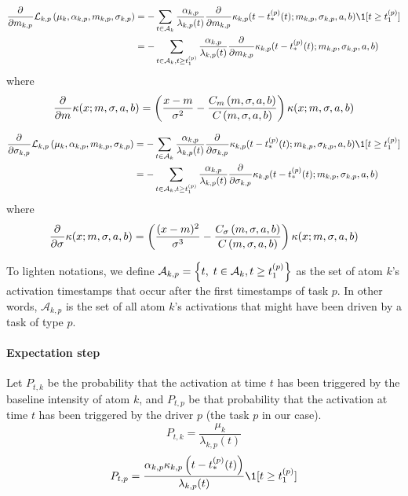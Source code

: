 \begin{equation}
\begin{split}
    \partiald{}{m_{k,p}}\mathcal{L}_{k,p}\pars{\mu_k, \alpha_{k,p}, m_{k,p}, \sigma_{k,p}} &= -\sum_{t\in\mathcal{A}_k}\frac{\alpha_{k,p}}{\lambda_{k,p}(t)}\partiald{}{m_{k,p}}\kappa_{k,p}(t - t_*^{(p)}(t); m_{k,p}, \sigma_{k,p}, a, b)\1[t \geq t_1^{(p)}] \\
    &= -\sum_{t\in\mathcal{A}_k, t \geq t_1^{(p)}}\frac{\alpha_{k,p}}{\lambda_{k,p}(t)}\partiald{}{m_{k,p}}\kappa_{k,p}(t - t_*^{(p)}(t); m_{k,p}, \sigma_{k,p}, a, b)
\end{split}
\end{equation}
where
\begin{equation}
    \frac{\partial^{}}{\partial {m}^{}}\kappa(x ; m, \sigma, a, b) = \left( \frac{x-m}{\sigma^2} - \frac{C_m\left( m, \sigma,a,b \right)}{C\left( m, \sigma,a,b \right)} \right)\kappa(x ; m, \sigma, a, b)
\end{equation}

\begin{equation}
\begin{split}
    \partiald{}{\sigma_{k,p}}\mathcal{L}_{k,p}\pars{\mu_k, \alpha_{k,p}, m_{k,p}, \sigma_{k,p}} &= -\sum_{t\in\mathcal{A}_k}\frac{\alpha_{k,p}}{\lambda_{k,p}(t)}\partiald{}{\sigma_{k,p}}\kappa_{k,p}(t - t_*^{(p)}(t); m_{k,p}, \sigma_{k,p}, a, b)\1[t \geq t_1^{(p)}] \\
    &= -\sum_{t\in\mathcal{A}_k, t \geq t_1^{(p)}}\frac{\alpha_{k,p}}{\lambda_{k,p}(t)}\partiald{}{\sigma_{k,p}}\kappa_{k,p}(t - t_*^{(p)}(t); m_{k,p}, \sigma_{k,p}, a, b)
\end{split}
\end{equation}
where
\begin{equation}
    \frac{\partial^{}}{\partial {\sigma}^{}}\kappa(x ; m, \sigma, a, b) = \left( \frac{(x-m)^2}{\sigma^3} - \frac{C_\sigma\left( m, \sigma,a,b \right)}{C\left( m, \sigma,a,b \right)} \right)\kappa(x ; m, \sigma, a, b)
\end{equation}

To lighten notations, we define $\mathcal{A}_{k,p} = \left\lbrace t,\; t\in\mathcal{A}_k, t \geq t_1^{(p)} \right\rbrace$ as the set of atom $k$'s activation timestamps that occur after the first timestamps of task $p$.
In other words, $\mathcal{A}_{k,p}$ is the set of all atom $k$'s activations that might have been driven by a task of type $p$.

\paragraph{Expectation step}
Let $P_{t,k}$ be the probability that the activation at time $t$ has been triggered by the baseline intensity of atom $k$, and $P_{t,p}$ be that probability that the activation at time $t$ has been triggered by the driver $p$ (the task $p$ in our case).
\begin{equation}
    P_{t,k} = \frac{\mu_k}{\lambda_{k,p}(t)}
\end{equation}
\begin{equation}
    P_{t,p} = \frac{\alpha_{k,p}\kappa_{k,p}\pars{t - t_*^{(p)}(t)}}{\lambda_{k,p}(t)}\1[t \geq t_1^{(p)}]
\end{equation}

